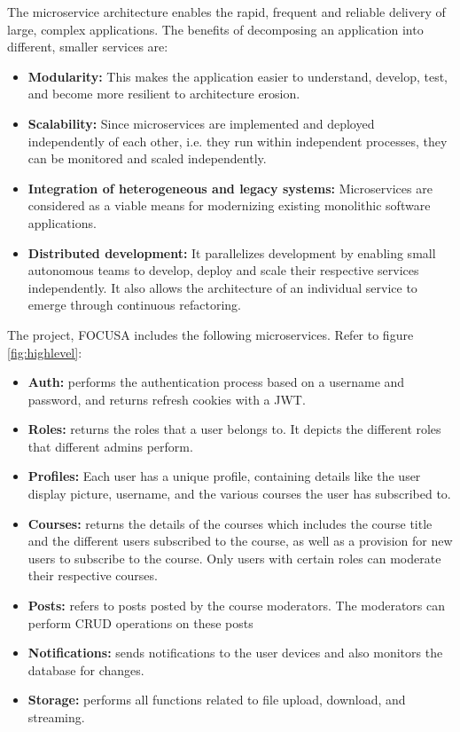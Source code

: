 The microservice architecture enables the rapid, frequent and reliable delivery of large, complex applications.
The benefits of decomposing an application into different, smaller services are:
\begin{itemize}
    \item \textbf{Modularity:} This makes the application easier to understand, develop, test, and become more resilient to architecture erosion.
    \item \textbf{Scalability:} Since microservices are implemented and deployed independently of each other, i.e. they run within independent processes, they can be monitored and scaled independently.
    \item \textbf{Integration of heterogeneous and legacy systems:} Microservices are considered as a 
    viable means for modernizing existing monolithic software applications.
    \item \textbf{Distributed development:} It parallelizes development by enabling small autonomous teams to develop, deploy and scale their respective services independently. It also allows the architecture of an individual service to emerge through continuous refactoring.
\end{itemize}

The project, FOCUSA includes the following microservices. Refer to figure \ref{fig:highlevel}:
\begin{itemize}
    \item \textbf{Auth:} performs the authentication process based on a username and password, and returns refresh cookies with a JWT.
    \item \textbf{Roles:}  returns the roles that a user belongs to. It depicts the different roles that different admins perform.
    \item \textbf{Profiles:} Each user has a unique profile, containing details like the user display picture, username, and the various courses the user has subscribed to.
    \item \textbf{Courses:}  returns the details of the courses which includes the course title and the different users subscribed to the course, as well as a provision for new users to subscribe to the course. Only users with certain roles can moderate their respective courses.
    \item \textbf{Posts:} refers to posts posted by the course moderators. The moderators can perform CRUD operations on these posts
    \item \textbf{Notifications:}  sends notifications to the user devices and also monitors the database for changes.
    \item \textbf{Storage:} performs all functions related to file upload, download, and streaming.
\end{itemize}


